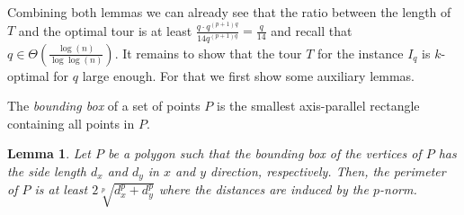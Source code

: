 \documentclass[a4paper, 11pt]{article}
\newtheorem{lemma}[theorem]{Lemma}
\begin{document}
Combining both lemmas we can already see that the ratio between the length of $T$ and the optimal tour is at least $\frac{q\cdot q^{(p+1)q}}{14q^{(p+1)q}}=\frac{q}{14}$ and recall that $q\in \Theta\left(\frac{\log(n)}{\log\log(n)}\right)$. It remains to show that the tour $T$ for the instance $I_q$ is $k$-optimal for $q$ large enough. For that we first show some auxiliary lemmas.

The \emph{bounding box} of a set of points $P$ is the smallest axis-parallel rectangle containing all points in $P$. 

\begin{lemma}\label{connecting edge}
Let $P$ be a polygon such that the bounding box of the vertices of $P$ has the side length $d_x$ and $d_y$ in $x$ and $y$ direction, respectively. Then, the perimeter of $P$ is at least $2\sqrt[p]{d_x^p+d_y^p}$ where the distances are induced by the $p$-norm.
\end{lemma}
\end{document}
